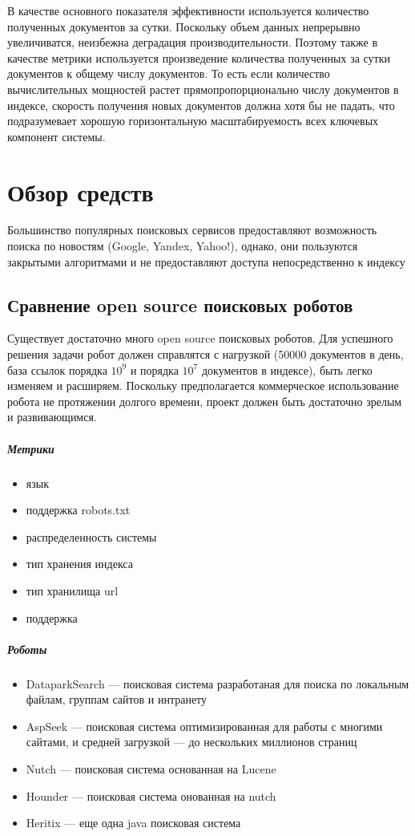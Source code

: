В качестве основного показателя эффективности используется количество полученных документов за сутки.
 Поскольку объем данных непрерывно увеличиватся, неизбежна деградация производительности.
 Поэтому также в качестве метрики используется произведение количества полученных за сутки документов к общему числу документов. То есть если количество вычислительных мощностей растет прямопропорционально числу документов в индексе, скорость получения новых документов должна хотя бы не падать, что подразумевает хорошую горизонтальную масштабируемость всех ключевых компонент системы.



\chapter{Обзор средств}
Большинство популярных поисковых сервисов предоставляют возможность поиска по новостям (Google, Yandex, Yahoo!), однако, они пользуются закрытыми алгоритмами и не предоставляют доступа непосредственно к индексу
\section{Сравнение open source поисковых роботов}
Существует достаточно много open source поисковых роботов. Для успешного решения задачи робот должен справлятся с нагрузкой (50000 документов в день, база ссылок порядка $10^{9}$ и порядка $10^7$ документов в индексе), быть легко изменяем и расширяем. Поскольку предполагается коммерческое использование робота не протяжении долгого времени, проект должен быть достаточно зрелым и развивающимся.
\paragraph{Метрики}
\begin{itemize}
 \item язык
 \item поддержка robots.txt
 \item распределенность системы
 \item тип хранения индекса
 \item тип хранилища url
 \item поддержка
\end{itemize}
\paragraph{Роботы}
\begin{itemize}
 \item DataparkSearch --- поисковая система разработаная для поиска по локальным файлам, группам сайтов и интранету
 \item AspSeek --- поисковая система оптимизированная для работы с многими сайтами, и средней загрузкой --- до нескольких миллионов страниц
 \item Nutch --- поисковая система основанная на Lucene
 \item Hounder --- поисковая система онованная на nutch
 \item Heritix --- еще одна java поисковая система
\end{itemize}
